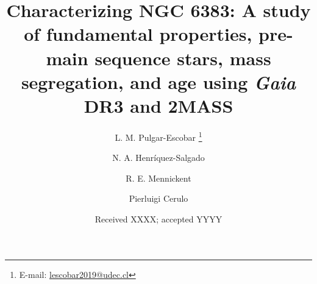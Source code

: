 \documentclass{aa}
\begin{document}
   \title{Characterizing NGC 6383: A study of fundamental properties, pre-main sequence stars, mass segregation, and age using \textit{Gaia} DR3 and 2MASS}

   \author{L. M. Pulgar-Escobar
          \thanks{E-mail: \href{mailto:lescobar2019@udec.cl}{lescobar2019@udec.cl}}
          \and
        N. A. Henríquez-Salgado
        \and 
        R. E. Mennickent
        \and
        Pierluigi Cerulo
          }


   \date{Received XXXX; accepted YYYY}  %
\end{document}
